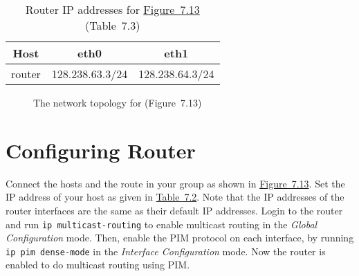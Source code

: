 \documentclass{../UTNetLab}
\begin{document}
    \begin{table}[H]
        \caption{Router IP addresses for \hyperref[fig:7.13]{Figure~7.13} (Table~7.3)}
        \label{tab:7.3}
        \centering
        \begin{tabular}{ *3c }
            \hline \hline
            Host & eth0 & eth1 \\
            \hline
            router & 128.238.63.3/24 & 128.238.64.3/24 \\
            \hline \hline
            \end{tabular}
    \end{table}

    \begin{figure}[H]
        \centering
        \caption{The network topology for  (Figure~7.13)}
        \label{fig:7.13}
    \end{figure}

\section{Configuring Router}
\label{sec:config-router}
    Connect the hosts and the route in your group as shown in \hyperref[fig:7.13]{Figure~7.13}. Set the IP address of your host as given in \hyperref[tab:7.2]{Table~7.2}. Note that the IP addresses of the router interfaces are the same as their default IP addresses.
    Login to the router and run \lstinline{ip multicast-routing} to enable multicast routing in the \textit{Global Configuration} mode.
    Then, enable the PIM protocol on each interface, by running \lstinline{ip pim dense-mode} in the \textit{Interface Configuration} mode. Now the router is enabled to do multicast routing using PIM.
\end{document}
